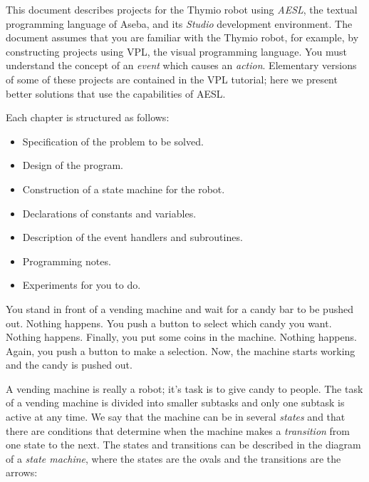 \label{ch.intro}

This document describes projects for the Thymio robot using \emph{AESL},
the textual programming language of Aseba, and its \emph{Studio}
development environment. The document assumes that you are familiar with
the Thymio robot, for example, by constructing projects using VPL, the
visual programming language. You must understand the concept of an
\emph{event} which causes an \emph{action}. Elementary versions of some
of these projects are contained in the VPL tutorial; here we present
better solutions that use the capabilities of AESL.


Each chapter is structured as follows:

\begin{itemize}
\item Specification of the problem to be solved.
\item Design of the program.
\item Construction of a state machine for the robot.
\item Declarations of constants and variables.
\item Description of the event handlers and subroutines.
\item Programming notes.
\item Experiments for you to do.
\end{itemize}


\newpage


You stand in front of a vending machine and wait for a candy bar to be
pushed out. Nothing happens. You push a button to select which candy you
want. Nothing happens. Finally, you put some coins in the machine.
Nothing happens. Again, you push a button to make a selection. Now, the
machine starts working and the candy is pushed out.

A vending machine is really a robot; it's task is to give candy to
people. The task of a vending machine is divided into
smaller subtasks and only one subtask is active at any time. We say that
the machine can be in several \emph{states} and that there are
conditions that determine when the machine makes a \emph{transition}
from one state to the next. The states and transitions can be described
in the diagram of a \emph{state machine}, where the states are the ovals
and the transitions are the arrows:

